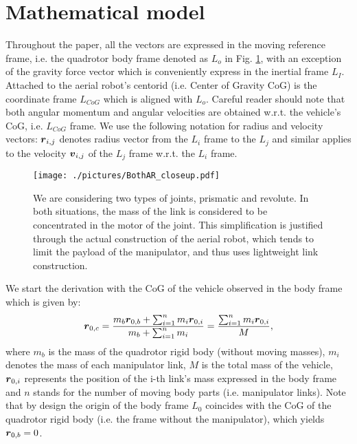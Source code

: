 \section{Mathematical model}
Throughout the paper, all the vectors are expressed in the moving reference frame, i.e. the quadrotor body frame denoted as $L_o$ in Fig. \ref{fig:BothAR_closeup}, with an exception of the gravity force vector which is conveniently express in the inertial frame $L_I$. Attached to the aerial robot's centorid (i.e. Center of Gravity CoG) is the coordinate frame $L_{CoG}$ which is aligned with $L_o$. Careful reader should note that both angular momentum and angular velocities are obtained w.r.t. the vehicle's CoG, i.e. $L_{CoG}$ frame. We use the following notation for radius and velocity vectors:  $\boldsymbol{r}_{i,j}$ denotes radius vector from the $L_i$ frame to the $L_{j}$ and similar applies to the velocity $\boldsymbol{v}_{i,j}$ of the $L_j$ frame w.r.t. the $L_{i}$ frame.


\begin{figure}
	\centering
	\texttt{[image: ./pictures/BothAR\_closeup.pdf]}
	\caption{We are considering two types of joints, prismatic and revolute. In both situations, the mass of the link is considered to be concentrated in the motor of the joint. This simplification is justified through the actual construction of the aerial robot, which tends to limit the payload of the manipulator, and thus uses lightweight link construction.}
	\label{fig:BothAR_closeup}
\end{figure}

We start the derivation with the CoG of the vehicle observed in the body frame which is given by:
\begin{equation}
\boldsymbol{r}_{0,c} = \frac{m_{b}\boldsymbol{r}_{0,b} + \sum_{i=1}^n m_{i}\boldsymbol{r}_{0,i}}{m_{b} + \sum_{i=1}^n m_{i}} = \frac{\sum_{i=1}^n m_{i}\boldsymbol{r}_{0,i}}{M},
\label{equ:cog}
\end{equation}
where $m_b$ is the mass of the quadrotor rigid body (without moving masses), $m_i$ denotes the mass of each manipulator link, $M$ is the total mass of the vehicle, $\boldsymbol{r}_{0,i}$ represents the position of the i-th link's mass expressed in the body frame and $n$ stands for the number of moving body parts (i.e. manipulator links). Note that by design the origin of the body frame $L_0$ coincides with the CoG of the quadrotor rigid body (i.e. the frame without the manipulator), which yields $\boldsymbol{r}_{0,b} = 0$.

